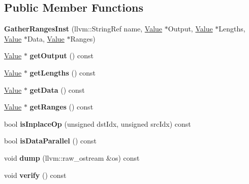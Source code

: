 \subsection*{Public Member Functions}
\begin{DoxyCompactItemize}
\item 
\mbox{\label{classglow_1_1_gather_ranges_inst_a91f4caa3e00cba9aab9276ce0c6c2fe0}} 
{\bfseries Gather\+Ranges\+Inst} (llvm\+::\+String\+Ref name, \hyperlink{classglow_1_1_value}{Value} $\ast$Output, \hyperlink{classglow_1_1_value}{Value} $\ast$Lengths, \hyperlink{classglow_1_1_value}{Value} $\ast$Data, \hyperlink{classglow_1_1_value}{Value} $\ast$Ranges)
\item 
\mbox{\label{classglow_1_1_gather_ranges_inst_ac00e4ec2f0e07037ca9140b2c4b02aac}} 
\hyperlink{classglow_1_1_value}{Value} $\ast$ {\bfseries get\+Output} () const
\item 
\mbox{\label{classglow_1_1_gather_ranges_inst_a4b8be58d91be321bc264bab92259bf37}} 
\hyperlink{classglow_1_1_value}{Value} $\ast$ {\bfseries get\+Lengths} () const
\item 
\mbox{\label{classglow_1_1_gather_ranges_inst_ac91d0488ed15aaf44874c52bade779b9}} 
\hyperlink{classglow_1_1_value}{Value} $\ast$ {\bfseries get\+Data} () const
\item 
\mbox{\label{classglow_1_1_gather_ranges_inst_aad23f59b06d609d8c728373ba2776e8b}} 
\hyperlink{classglow_1_1_value}{Value} $\ast$ {\bfseries get\+Ranges} () const
\item 
\mbox{\label{classglow_1_1_gather_ranges_inst_ae40ee9a71d17eb4f11558c13ac2ab5b1}} 
bool {\bfseries is\+Inplace\+Op} (unsigned dst\+Idx, unsigned src\+Idx) const
\item 
\mbox{\label{classglow_1_1_gather_ranges_inst_a796b681667844d6dcb0de3fb8a233f39}} 
bool {\bfseries is\+Data\+Parallel} () const
\item 
\mbox{\label{classglow_1_1_gather_ranges_inst_ac758f472808399407ab9f41f1e44a9cc}} 
void {\bfseries dump} (llvm\+::raw\+\_\+ostream \&os) const
\item 
\mbox{\label{classglow_1_1_gather_ranges_inst_af740fd24f9abf582c500b4d350e3b2a8}} 
void {\bfseries verify} () const
\end{DoxyCompactItemize}
